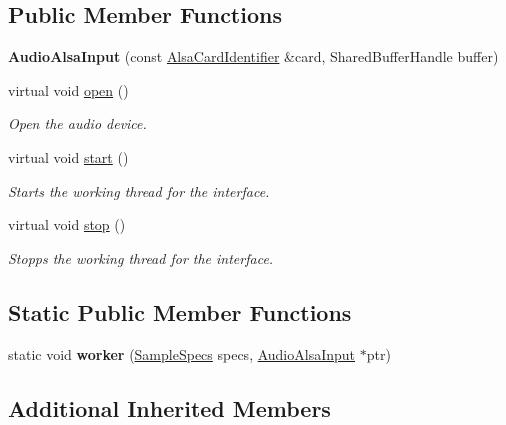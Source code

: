 \subsection*{Public Member Functions}
\begin{DoxyCompactItemize}
\item 
\hypertarget{classNl_1_1AudioAlsaInput_ac2d6401ab9becd5f88a9a6484f2f9257}{{\bfseries Audio\-Alsa\-Input} (const \hyperlink{classNl_1_1AlsaCardIdentifier}{Alsa\-Card\-Identifier} \&card, Shared\-Buffer\-Handle buffer)}\label{classNl_1_1AudioAlsaInput_ac2d6401ab9becd5f88a9a6484f2f9257}

\item 
virtual void \hyperlink{classNl_1_1AudioAlsaInput_a9e3afb8dfb0615d745a4f362302ce99d}{open} ()
\begin{DoxyCompactList}\small\item\em Open the audio device. \end{DoxyCompactList}\item 
virtual void \hyperlink{classNl_1_1AudioAlsaInput_a9b8aa604c6e78b93b337ae68cb071e00}{start} ()
\begin{DoxyCompactList}\small\item\em Starts the working thread for the interface. \end{DoxyCompactList}\item 
virtual void \hyperlink{classNl_1_1AudioAlsaInput_a728ce3af74d71e387834a28922fc98c1}{stop} ()
\begin{DoxyCompactList}\small\item\em Stopps the working thread for the interface. \end{DoxyCompactList}\end{DoxyCompactItemize}
\subsection*{Static Public Member Functions}
\begin{DoxyCompactItemize}
\item 
\hypertarget{classNl_1_1AudioAlsaInput_abc2e1cd6bf4f23627565a127ac708fe1}{static void {\bfseries worker} (\hyperlink{structNl_1_1SampleSpecs}{Sample\-Specs} specs, \hyperlink{classNl_1_1AudioAlsaInput}{Audio\-Alsa\-Input} $\ast$ptr)}\label{classNl_1_1AudioAlsaInput_abc2e1cd6bf4f23627565a127ac708fe1}

\end{DoxyCompactItemize}
\subsection*{Additional Inherited Members}


